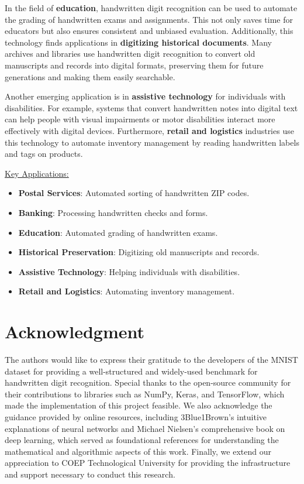 \documentclass[conference]{IEEEtran}
\begin{document}
In the field of \textbf{education}, handwritten digit recognition can be used to automate the grading of handwritten exams and assignments. This not only saves time for educators but also ensures consistent and unbiased evaluation. Additionally, this technology finds applications in \textbf{digitizing historical documents}. Many archives and libraries use handwritten digit recognition to convert old manuscripts and records into digital formats, preserving them for future generations and making them easily searchable.

Another emerging application is in \textbf{assistive technology} for individuals with disabilities. For example, systems that convert handwritten notes into digital text can help people with visual impairments or motor disabilities interact more effectively with digital devices. Furthermore, \textbf{retail and logistics} industries use this technology to automate inventory management by reading handwritten labels and tags on products.

\underline{Key Applications:}
\begin{itemize}
    \item \textbf{Postal Services}: Automated sorting of handwritten ZIP codes.
    \item \textbf{Banking}: Processing handwritten checks and forms.
    \item \textbf{Education}: Automated grading of handwritten exams.
    \item \textbf{Historical Preservation}: Digitizing old manuscripts and records.
    \item \textbf{Assistive Technology}: Helping individuals with disabilities.
    \item \textbf{Retail and Logistics}: Automating inventory management.
\end{itemize}

\section*{Acknowledgment}

The authors would like to express their gratitude to the developers of the MNIST dataset for providing a well-structured and widely-used benchmark for handwritten digit recognition. Special thanks to the open-source community for their contributions to libraries such as NumPy, Keras, and TensorFlow, which made the implementation of this project feasible. We also acknowledge the guidance provided by online resources, including 3Blue1Brown's intuitive explanations of neural networks and Michael Nielsen's comprehensive book on deep learning, which served as foundational references for understanding the mathematical and algorithmic aspects of this work. Finally, we extend our appreciation to COEP Technological University for providing the infrastructure and support necessary to conduct this research.
\end{document}
